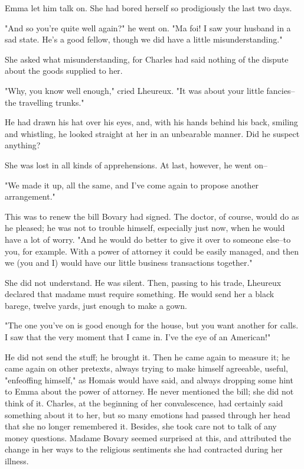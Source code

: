 \documentclass[11pt,twocolumn]{ltugboat}
\begin{document}
Emma let him talk on. She had bored herself so prodigiously the last two
days.

"And so you're quite well again?" he went on. "Ma foi! I saw your
husband in a sad state. He's a good fellow, though we did have a little
misunderstanding."

She asked what misunderstanding, for Charles had said nothing of the
dispute about the goods supplied to her.

"Why, you know well enough," cried Lheureux. "It was about your little
fancies--the travelling trunks."

He had drawn his hat over his eyes, and, with his hands behind his
back, smiling and whistling, he looked straight at her in an unbearable
manner. Did he suspect anything?

She was lost in all kinds of apprehensions. At last, however, he went
on--

"We made it up, all the same, and I've come again to propose another
arrangement."

This was to renew the bill Bovary had signed. The doctor, of course,
would do as he pleased; he was not to trouble himself, especially just
now, when he would have a lot of worry. "And he would do better to give
it over to someone else--to you, for example. With a power of attorney
it could be easily managed, and then we (you and I) would have our
little business transactions together."

She did not understand. He was silent. Then, passing to his trade,
Lheureux declared that madame must require something. He would send her
a black barege, twelve yards, just enough to make a gown.

"The one you've on is good enough for the house, but you want another
for calls. I saw that the very moment that I came in. I've the eye of an
American!"

He did not send the stuff; he brought it. Then he came again to measure
it; he came again on other pretexts, always trying to make himself
agreeable, useful, "enfeoffing himself," as Homais would have said, and
always dropping some hint to Emma about the power of attorney. He never
mentioned the bill; she did not think of it. Charles, at the beginning
of her convalescence, had certainly said something about it to her,
but so many emotions had passed through her head that she no longer
remembered it. Besides, she took care not to talk of any money
questions. Madame Bovary seemed surprised at this, and attributed the
change in her ways to the religious sentiments she had contracted during
her illness.
\end{document}

